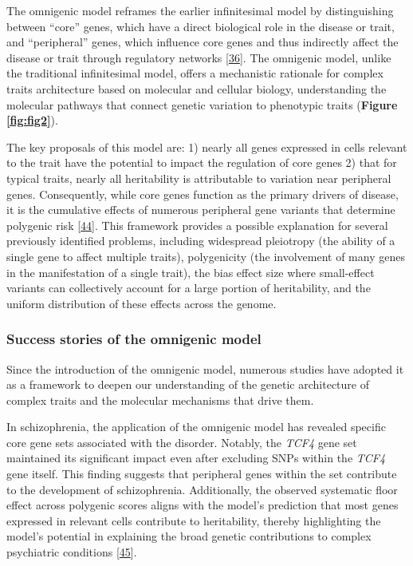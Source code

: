 The omnigenic model reframes the earlier infinitesimal model by distinguishing between ``core'' genes, which have a direct biological role in the disease or trait, and ``peripheral'' genes, which influence core genes and thus indirectly affect the disease or trait through regulatory networks {[}\protect\hyperlink{ref-vpIDZCSa}{36}{]}.
The omnigenic model, unlike the traditional infinitesimal model, offers a mechanistic rationale for complex traits architecture based on molecular and cellular biology, understanding the molecular pathways that connect genetic variation to phenotypic traits (\textbf{Figure \ref{fig:fig2}}).

The key proposals of this model are: 1) nearly all genes expressed in cells relevant to the trait have the potential to impact the regulation of core genes 2) that for typical traits, nearly all heritability is attributable to variation near peripheral genes.
Consequently, while core genes function as the primary drivers of disease, it is the cumulative effects of numerous peripheral gene variants that determine polygenic risk {[}\protect\hyperlink{ref-LXvTZzEA}{44}{]}.
This framework provides a possible explanation for several previously identified problems, including widespread pleiotropy (the ability of a single gene to affect multiple traits), polygenicity (the involvement of many genes in the manifestation of a single trait), the bias effect size where small-effect variants can collectively account for a large portion of heritability, and the uniform distribution of these effects across the genome.

\hypertarget{success-stories-of-the-omnigenic-model}{%
\subsubsection{Success stories of the omnigenic model}\label{success-stories-of-the-omnigenic-model}}

Since the introduction of the omnigenic model, numerous studies have adopted it as a framework to deepen our understanding of the genetic architecture of complex traits and the molecular mechanisms that drive them.

In schizophrenia, the application of the omnigenic model has revealed specific core gene sets associated with the disorder.
Notably, the \emph{TCF4} gene set maintained its significant impact even after excluding SNPs within the \emph{TCF4} gene itself.
This finding suggests that peripheral genes within the set contribute to the development of schizophrenia.
Additionally, the observed systematic floor effect across polygenic scores aligns with the model's prediction that most genes expressed in relevant cells contribute to heritability, thereby highlighting the model's potential in explaining the broad genetic contributions to complex psychiatric conditions {[}\protect\hyperlink{ref-fV6THoBG}{45}{]}.

